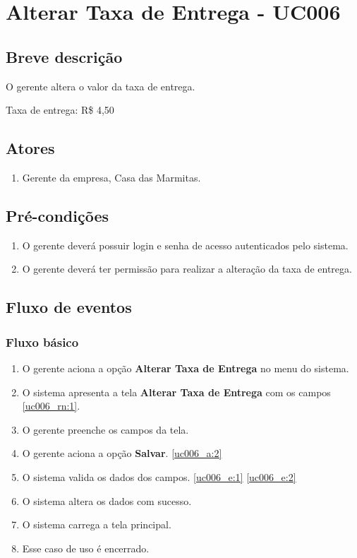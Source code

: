 \chapter{Alterar Taxa de Entrega - UC006} \label{uc006}

\section{Breve descrição}

O gerente altera o valor da taxa de entrega.

Taxa de entrega: R\$ 4,50

\section{Atores}

\begin{enumerate}
	\item Gerente da empresa, Casa das Marmitas.
\end{enumerate}

\section{Pré-condições}

\begin{enumerate}
	\item O gerente deverá possuir login e senha de acesso autenticados pelo sistema.
	\item O gerente deverá ter permissão para realizar a alteração da taxa de entrega.
\end{enumerate}

\section{Fluxo de eventos}

\subsection{Fluxo básico}

\begin{enumerate}[label=P\arabic*]
	\item O gerente aciona a opção \textbf{Alterar Taxa de Entrega} no menu do sistema.
	\item O sistema apresenta a tela \textbf{Alterar Taxa de Entrega} com os campos \ref{uc006_rn:1}. \label{uc006_p:2}
	\item O gerente preenche os campos da tela. \label{uc006_p:3}
	\item O gerente aciona a opção \textbf{Salvar}. \label{uc006_p:4}\ref{uc006_a:2}
	\item O sistema valida os dados dos campos. \ref{uc006_e:1} \ref{uc006_e:2}
	\item O sistema altera os dados com sucesso.
	\item O sistema carrega a tela principal.
	\item Esse caso de uso é encerrado.	
\end{enumerate}

